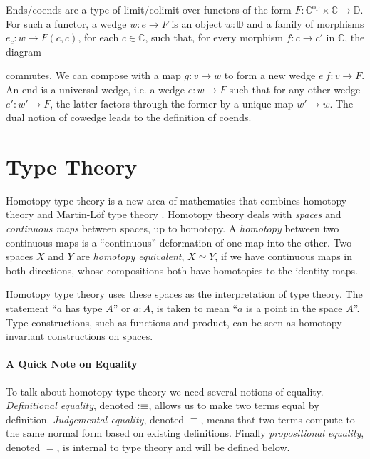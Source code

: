 \documentclass[12pt, parskip, DIV=14]{scrbook}
\newcommand{\defeq}{\vcentcolon\equiv}
\begin{document}
Ends/coends are a type of limit/colimit over functors of the form $F : \mathbb{C}^\mathrm{op} \times \mathbb{C} \to \mathbb{D}$. For such a functor, a wedge $w : e \to F$ is an object $w : \mathbb{D}$ and a family of morphisms $e_c : w \to F(c,c)$, for each $c \in \mathbb{C}$, such that, for every morphism $f : c \to c'$ in $\mathbb{C}$, the diagram
\begin{center}
\end{center}
commutes. We can compose with a map $g : v \to w$ to form a new wedge $e~f : v \to F$. An end is a universal wedge, i.e. a wedge $e : w \to F$ such that for any other wedge $e' : w' \to F$, the latter factors through the former by a unique map $w' \to w$. The dual notion of cowedge leads to the definition of coends.


\section{Type Theory}
\label{sec:HoTT}

Homotopy type theory is a new area of mathematics that combines homotopy theory and Martin-L\"of type theory \citep{martin1975intuitionistic}. Homotopy theory deals with \textit{spaces} and \textit{continuous maps} between spaces, up to homotopy. A \textit{homotopy} between two continuous maps is a ``continuous'' deformation of one map into the other. Two spaces $X$ and $Y$ are \textit{homotopy equivalent}, $X \simeq Y$, if we have continuous maps in both directions, whose compositions both have homotopies to the identity maps.

Homotopy type theory uses these spaces as the interpretation of type theory. The statement ``$a$ has type $A$'' or $a : A$, is taken to mean ``$a$ is a point in the space $A$''. Type constructions, such as functions and product, can be seen as homotopy-invariant constructions on spaces.

\paragraph{A Quick Note on Equality} To talk about homotopy type theory we need several notions of equality. \textit{Definitional equality}, denoted $\defeq$, allows us to make two terms equal by definition. \textit{Judgemental equality}, denoted $\equiv$, means that two terms compute to the same normal form based on existing definitions. Finally \textit{propositional equality}, denoted $=$, is internal to type theory and will be defined below.
\end{document}
